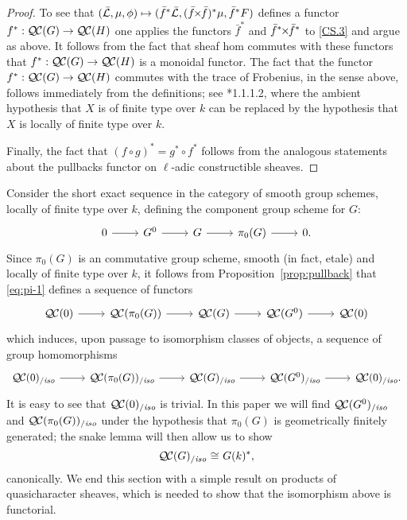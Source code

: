 \documentclass[11pt]{amsart}
\theoremstyle{plain}
\theoremstyle{definition}
\theoremstyle{remark}
\newcommand{\EE}{\mathbb{\bar Q}_\ell}
\newcommand{\Fq}{k}
\DeclareMathOperator{\Hom}{Hom}
\newcommand{\iso}{{\ \cong\ }}
\newcommand{\gcs}[1]{{\mathcal{\bar #1}}}
\newcommand{\QC}{{\mathcal{Q\hskip-0.8pt C}}}
\newcommand{\QCiso}[1]{\QC(#1)_{/\textit{iso}}}
\renewcommand{\bf}{\bar{f}}
\newcommand{\tight}[3]{\hspace{-#1pt}{#2}\hspace{-#3pt}}
\newcommand{\bfxf}{\text{$\bar{f} \tight{1}{\times}{1} \bar{f}$}}
\newcommand\David[1]{\marginpar{\smaller\smaller DR: #1}}
\begin{document}
\begin{proof}
  To see that $(\gcs{L},\mu,\phi) \mapsto (\bf^*\gcs{L},(\bfxf)^*\mu,\bf^*F)$
  defines a functor $f^* : \QC(G) \to \QC(H)$ one applies the functors $\bf^*$ and
  $\bf^*\tight{1}{\times}{1}\bf^*$ to \ref{CS.3} and argue as
  above. It follows from the fact that sheaf hom commutes with these
  functors that $f^* : \QC(G) \to \QC(H)$ is a monoidal functor.
%
  The fact that the functor $f^* : \QC(G) \to \QC(H)$ commutes with
  the trace of Frobenius, in the sense above, follows immediately from
  the definitions; see \cite{laumon:87a}*{1.1.1.2}, where the ambient
  hypothesis that $X$ is of finite type over $\Fq$ can be replaced by
  the hypothesis that $X$ is locally of finite type over $\Fq$.
  
  Finally, the fact that $(f\circ g)^* = g^* \circ f^*$ follows from the analogous
  statements about the pullbacks functor on $\ell$-adic constructible sheaves.
\end{proof}

Consider the short exact sequence in the category of smooth group
schemes, locally of finite type over $\Fq$, defining the component
group scheme for $G$:
\begin{equation}\label{eq:pi-2}
\begin{tikzcd}
0 \rar & G^0 \rar & G \rar & \pi_0(G) \rar & 0.
\end{tikzcd}
\end{equation}
Since $\pi_0(G)$ is an commutative group scheme, smooth (in fact, etale) and locally of finite type over $\Fq$, 
it follows from Proposition~\ref{prop:pullback} that \eqref{eq:pi-1} defines a sequence of functors
\[
\begin{tikzcd}
\QC(0) \rar & \QC(\pi_0(G)) \rar & \QC(G) \rar & \QC(G^0) \rar & \QC(0)
\end{tikzcd}
\]
which induces, upon passage to isomorphism classes of objects, a sequence of group homomorphisms 
\begin{equation}\label{eq:pi-1}
\begin{tikzcd}
\QCiso{0} \rar & \QCiso{\pi_0(G)} \rar & \QCiso{G} \rar & \QCiso{G^0} \rar & \QCiso{0}.
\end{tikzcd}
\end{equation}
It is easy to see that $\QCiso{0}$ is trivial. In this paper we will find $\QCiso{G^0}$ and $\QCiso{\pi_0(G)}$ under the hypothesis that $\pi_0(G)$ is geometrically finitely generated; 
the snake lemma will then allow us to show
\[
\QCiso{G} \iso G(\Fq)^*,%
\]
canonically.
We end this section with a simple result on products of quasicharacter sheaves, which is needed to show that the isomorphism above is functorial.
\end{document}
